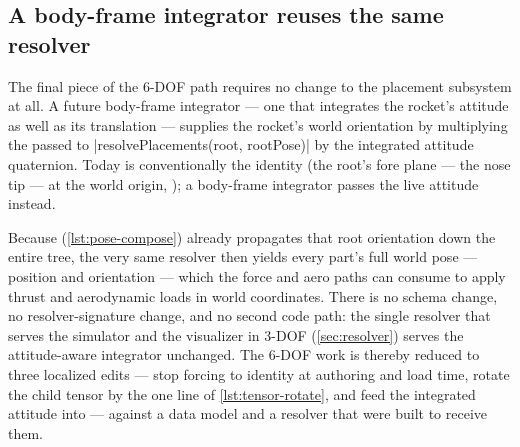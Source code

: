 \subsection{A body-frame integrator reuses the same resolver}

The final piece of the 6-DOF path requires no change to the placement subsystem at all. A future
body-frame integrator --- one that integrates the rocket's attitude as well as its translation ---
supplies the rocket's world orientation by multiplying the  passed to
\cppinline|resolvePlacements(root, rootPose)| by the integrated attitude quaternion. Today
 is conventionally the identity (the root's fore plane --- the nose tip --- at the
world origin, \zfwd); a body-frame integrator passes the live attitude instead.

Because  (\cref{lst:pose-compose}) already propagates that root orientation down the
entire tree, the very same resolver then yields every part's full world pose --- position and
orientation --- which the force and aero paths can consume to apply thrust and aerodynamic loads in
world coordinates. There is no schema change, no resolver-signature change, and no second code path:
the single resolver that serves the simulator and the visualizer in 3-DOF (\cref{sec:resolver})
serves the attitude-aware integrator unchanged. The 6-DOF work is thereby reduced to three localized
edits --- stop forcing  to identity at authoring and load time, rotate the child
tensor by the one line of \cref{lst:tensor-rotate}, and feed the integrated attitude into
 --- against a data model and a resolver that were built to receive them.
